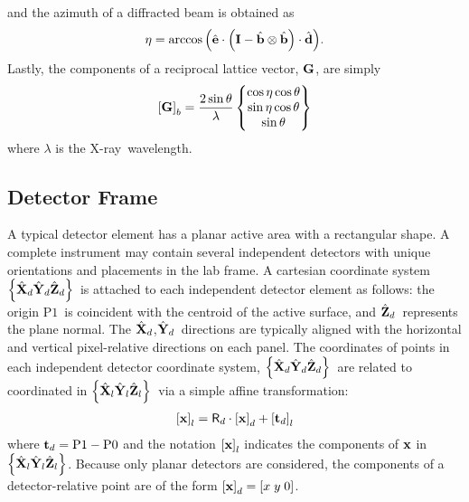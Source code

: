 \documentclass[12pt,letterpaper,final]{amsart}
\newcommand{\mbm}[1]{\ensuremath{\mbox{\boldmath$#1$}}}
\newcommand{\tvecd}{\ensuremath{\mbm{\mathrm{t}}_d}}
\newcommand{\rmatd}{\ensuremath{\mathsf{R}_d}}
\newcommand{\gvec}{\ensuremath{\mbm{\mathrm{G}}}}
\newcommand{\bhat}{\ensuremath{\hat{\mbm{\mathrm{b}}}}}
\newcommand{\dhat}{\ensuremath{\hat{\mbm{\mathrm{d}}}}}
\newcommand{\ehat}{\ensuremath{\hat{\mbm{\mathrm{e}}}}}
\newcommand{\eye}{\ensuremath{\mbm{\mathrm{I}}}}
\newcommand{\detpt}{\ensuremath{\mbm{\mathrm{x}}}}
\newcommand{\Pzero}{\ensuremath{\mathrm{P0}}}
\newcommand{\Pone}{\ensuremath{\mathrm{P1}}}
\newcommand{\Xl}{\ensuremath{\hat{\mbm{\mathrm{X}}}_l}}
\newcommand{\Yl}{\ensuremath{\hat{\mbm{\mathrm{Y}}}_l}}
\newcommand{\Zl}{\ensuremath{\hat{\mbm{\mathrm{Z}}}_l}}
\newcommand{\labframe}{\ensuremath{\left\{\Xl\Yl\Zl\right\}}}
\newcommand{\Xd}{\ensuremath{\hat{\mbm{\mathrm{X}}}_d}}
\newcommand{\Yd}{\ensuremath{\hat{\mbm{\mathrm{Y}}}_d}}
\newcommand{\Zd}{\ensuremath{\hat{\mbm{\mathrm{Z}}}_d}}
\newcommand{\detframe}{\ensuremath{\left\{\Xd\Yd\Zd\right\}}}
\newcommand{\labcomps}[1]{\left[#1\right]_l}
\newcommand{\beamcomps}[1]{\left[#1\right]_b}
\newcommand{\detcomps}[1]{\left[#1\right]_d}
\newcommand{\xray}{X-ray}
\begin{document}
and the azimuth of a diffracted beam is obtained as
\begin{equation}
  \eta = \arccos{\left(\ehat \cdot \left( \eye - \bhat \otimes \bhat \right)\cdot\dhat\right)}.
\end{equation}
Lastly, the components of a reciprocal lattice vector, \gvec, are
simply
\begin{equation}
  \beamcomps{\gvec} = \frac{2\sin{\theta}}{\lambda}\begin{Bmatrix}
    \cos\eta \cos\theta \\
    \sin\eta \cos\theta \\
    \sin\theta
  \end{Bmatrix}
\end{equation}
where $\lambda$ is the \xray\ wavelength.

\subsection{Detector Frame}\label{S:detector}
A typical detector element has a planar active area with a rectangular
shape.  A complete instrument may contain several independent
detectors with unique orientations and placements in the lab frame.  A
cartesian coordinate system \detframe\ is attached to each independent
detector element as follows: the origin \Pone\ is coincident with the
centroid of the active surface, and \Zd\ represents the plane normal.
The \Xd,\Yd\ directions are typically aligned with the horizontal and
vertical pixel-relative directions on each panel.  The coordinates of
points in each independent detector coordinate system, \detframe\, are
related to coordinated in \labframe\ via a simple affine
transformation:
\begin{gather}
  \labcomps{\detpt} = \rmatd\cdot\detcomps{\detpt} + \labcomps{\tvecd}
\end{gather}
where $\tvecd = \Pone - \Pzero$ and the notation
$\labcomps{\detpt}$ indicates the components of $\detpt$ in
\labframe.  Because only planar detectors are considered, the
components of a detector-relative point are of the form
$\detcomps{\detpt}=[x\; y\; 0]$.
\end{document}
